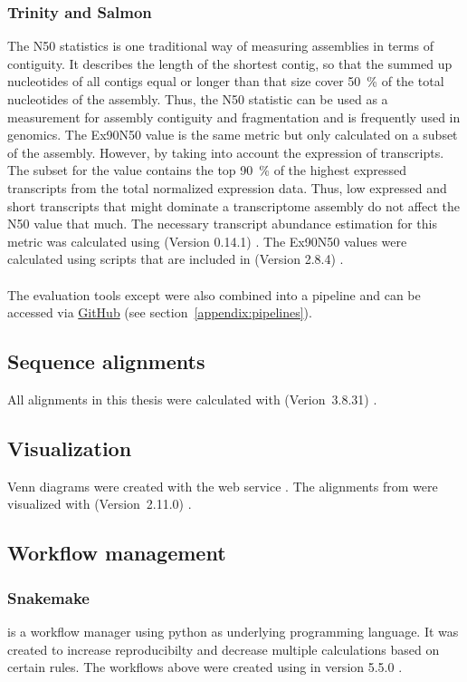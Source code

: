 \documentclass[12pt,a4paper,english]{article}
\begin{document}
\subsubsection*{Trinity and Salmon}
	The N50 statistics is one traditional way of measuring assemblies in terms of contiguity. 
	It describes the length of the shortest contig, so that the summed up nucleotides of all contigs equal or longer than that size cover 50~\% of the total nucleotides of the assembly. Thus, the N50 statistic can be used as a measurement for assembly contiguity and fragmentation and is frequently used in genomics.
	The Ex90N50 value is the same metric but only calculated on a subset of the assembly. However, by taking into account the expression of transcripts. The subset for the value contains the top 90~\% of the highest expressed transcripts from the total normalized expression data. 
	Thus, low expressed and short transcripts that might dominate a transcriptome assembly do not affect the N50 value that much.
	The necessary transcript abundance estimation for this metric was calculated using \salmon (Version 0.14.1) \citep{salmon:17}. The Ex90N50 values were calculated using scripts that are included in \trinity (Version 2.8.4) \citep{Trinity:11}.
	\\
	\\
	The evaluation tools except \blast were also combined into a \snakemake pipeline and can be accessed via \href{https://github.com/lmfaber/evaluation}{GitHub} (see section~\ref{appendix:pipelines}).

\subsection{Sequence alignments}
All alignments in this thesis were calculated with \muscle (Verion~3.8.31) \citep{muscle:04}.

\subsection{Visualization}
Venn diagrams were created with the \intervene web service \citep{intervene:17}. The alignments from \muscle were visualized with \jalview (Version~2.11.0) \citep{jalview:09}.

\subsection{Workflow management}
\subsubsection*{Snakemake}
	\snakemake is a workflow manager using python as underlying programming language. It was created to increase reproducibilty and decrease multiple calculations based on certain rules. The workflows above were created using \snakemake in version 5.5.0 \citep{Snakemake:12}.
\end{document}

